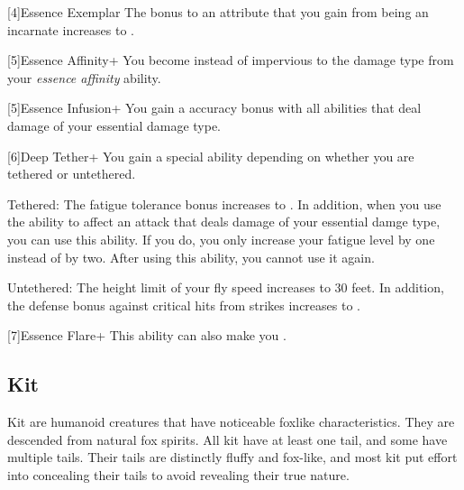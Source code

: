         [4]{Essence Exemplar} The bonus to an attribute that you gain from being an incarnate increases to .

        [5]{Essence Affinity+} You become  instead of impervious to the damage type from your \textit{essence affinity} ability.

        [5]{Essence Infusion+} You gain a  accuracy bonus with all abilities that deal damage of your essential damage type.

        [6]{Deep Tether+} You gain a special ability depending on whether you are tethered or untethered.
        \begin{raggeditemize}
            \item Tethered: The fatigue tolerance bonus increases to .
                In addition, when you use the  ability to affect an attack that deals damage of your essential damge type, you can use this ability.
                If you do, you only increase your fatigue level by one instead of by two.
                After using this ability, you  cannot use it again.
            \item Untethered: The height limit of your fly speed increases to 30 feet.
                In addition, the defense bonus against critical hits from strikes increases to .
        \end{raggeditemize}

        [7]{Essence Flare+} This ability can also make you  .

    \subsection{Kit}

        Kit are humanoid creatures that have noticeable foxlike characteristics.
        They are descended from natural fox spirits.
        All kit have at least one tail, and some have multiple tails.
        Their tails are distinctly fluffy and fox-like, and most kit put effort into concealing their tails to avoid revealing their true nature.

